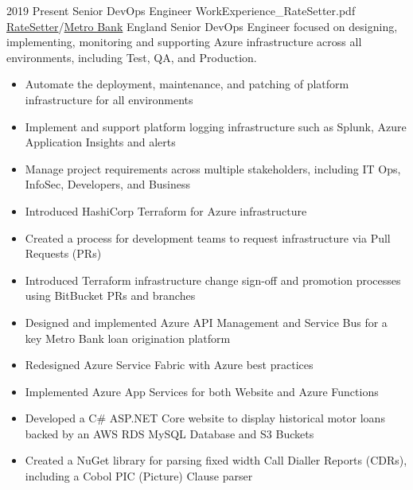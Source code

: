 
\begin{twenty}
\twentyitem
  {2019}
  {Present}
  {Senior DevOps Engineer}
  {WorkExperience_RateSetter.pdf}
  {\href{https://www.ratesetter.com/}{RateSetter}/\href{https://metrobankonline.co.uk}{Metro Bank}}
  {England}
  {Senior DevOps Engineer focused on designing, implementing, monitoring and supporting Azure infrastructure across all environments, including Test, QA, and Production.}
  {\begin{itemize}
    \item Automate the deployment, maintenance, and patching of platform infrastructure for all environments
    \item Implement and support platform logging infrastructure such as Splunk, Azure Application Insights and alerts
    \item Manage project requirements across multiple stakeholders, including IT Ops, InfoSec, Developers, and Business
  \end{itemize}}
  {\begin{itemize}
    \item Introduced HashiCorp Terraform for Azure infrastructure
    \item Created a process for development teams to request infrastructure via Pull Requests (PRs)
    \item Introduced Terraform infrastructure change sign-off and promotion processes using BitBucket PRs and branches
    \item Designed and implemented Azure API Management and Service Bus for a key Metro Bank loan origination platform
    \item Redesigned Azure Service Fabric with Azure best practices
    \item Implemented Azure App Services for both Website and Azure Functions
    \item Developed a C\# ASP.NET Core website to display historical motor loans backed by an AWS RDS MySQL Database and S3 Buckets
    \item Created a NuGet library for parsing fixed width Call Dialler Reports (CDRs), including a Cobol PIC (Picture) Clause parser
  \end{itemize}
  }
\end{twenty}

